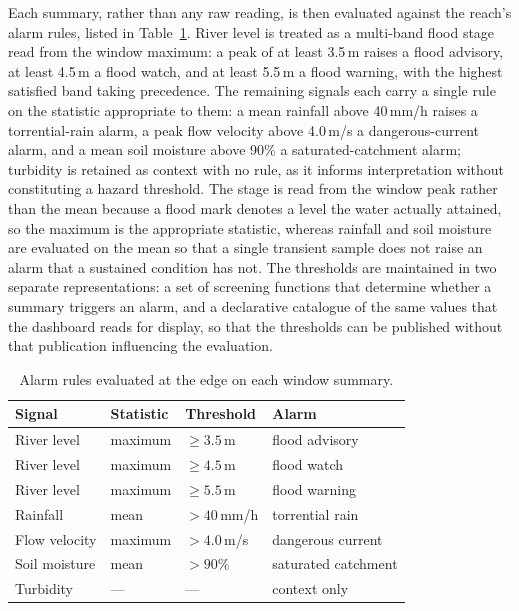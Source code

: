\documentclass[conference]{IEEEtran}
\begin{document}
Each summary, rather than any raw reading, is then evaluated against the reach's alarm rules, listed in Table~\ref{tab:rules}. River level is treated as a multi-band flood stage read from the window maximum: a peak of at least 3.5\,m raises a flood advisory, at least 4.5\,m a flood watch, and at least 5.5\,m a flood warning, with the highest satisfied band taking precedence. The remaining signals each carry a single rule on the statistic appropriate to them: a mean rainfall above 40\,mm/h raises a torrential-rain alarm, a peak flow velocity above 4.0\,m/s a dangerous-current alarm, and a mean soil moisture above 90\% a saturated-catchment alarm; turbidity is retained as context with no rule, as it informs interpretation without constituting a hazard threshold. The stage is read from the window peak rather than the mean because a flood mark denotes a level the water actually attained, so the maximum is the appropriate statistic, whereas rainfall and soil moisture are evaluated on the mean so that a single transient sample does not raise an alarm that a sustained condition has not. The thresholds are maintained in two separate representations: a set of screening functions that determine whether a summary triggers an alarm, and a declarative catalogue of the same values that the dashboard reads for display, so that the thresholds can be published without that publication influencing the evaluation.

\begin{table}[t]
\caption{Alarm rules evaluated at the edge on each window summary.}
\label{tab:rules}
\centering
\renewcommand{\arraystretch}{1.25}
\begin{tabular}{@{}p{1.7cm}p{1.1cm}p{1.6cm}p{2.1cm}@{}}
\hline
\textbf{Signal} & \textbf{Statistic} & \textbf{Threshold} & \textbf{Alarm} \\
\hline
River level & maximum & $\geq 3.5$\,m & flood advisory \\
River level & maximum & $\geq 4.5$\,m & flood watch \\
River level & maximum & $\geq 5.5$\,m & flood warning \\
Rainfall & mean & $> 40$\,mm/h & torrential rain \\
Flow velocity & maximum & $> 4.0$\,m/s & dangerous current \\
Soil moisture & mean & $> 90\%$ & saturated catchment \\
Turbidity & --- & --- & context only \\
\hline
\end{tabular}
\end{table}
\end{document}

